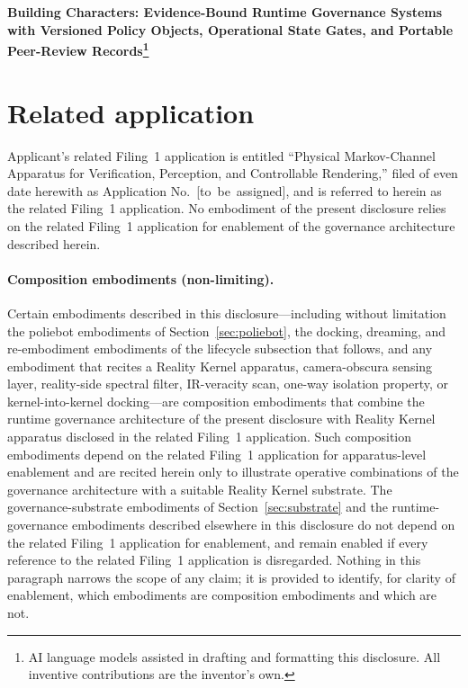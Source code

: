 \documentclass[a4paper,12pt]{article}
\newif\ifreview
\newcommand{\RK}{Reality Kernel\xspace}
\begin{document}
\ifreview\linenumbers\fi


\begin{center}
{\Large\bfseries Building Characters: Evidence-Bound Runtime Governance Systems with Versioned
Policy Objects, Operational State Gates, and Portable Peer-Review
Records\footnote{AI language models assisted in drafting and formatting
this disclosure. All inventive contributions are the inventor's own.}}
\end{center}

\bigskip

\section*{Related application}

Applicant's related Filing~1 application is entitled
``Physical Markov-Channel Apparatus for Verification,
Perception, and Controllable Rendering,'' filed of even date
herewith as Application No.~[to~be~assigned], and is referred
to herein as the related Filing~1 application. No embodiment
of the present disclosure relies on the related Filing~1
application for enablement of the governance architecture
described herein.

\paragraph{Composition embodiments (non-limiting).}
Certain embodiments described in this disclosure---including
without limitation the poliebot embodiments of
Section~\ref{sec:poliebot}, the docking, dreaming, and
re-embodiment embodiments of the lifecycle subsection that
follows, and any embodiment that recites a \RK{} apparatus,
camera-obscura sensing layer, reality-side spectral filter,
IR-veracity scan, one-way isolation property, or
kernel-into-kernel docking---are composition embodiments that
combine the runtime governance architecture of the present
disclosure with \RK apparatus disclosed in the
related Filing~1 application. Such composition embodiments
depend on the related Filing~1 application for apparatus-level
enablement and are recited herein only to illustrate operative
combinations of the governance architecture with a suitable
\RK substrate. The governance-substrate embodiments
of Section~\ref{sec:substrate} and the runtime-governance
embodiments described elsewhere in this disclosure do not
depend on the related Filing~1 application for enablement, and
remain enabled if every reference to the related Filing~1
application is disregarded. Nothing in this paragraph narrows
the scope of any claim; it is provided to identify, for
clarity of enablement, which embodiments are composition
embodiments and which are not.
\end{document}
